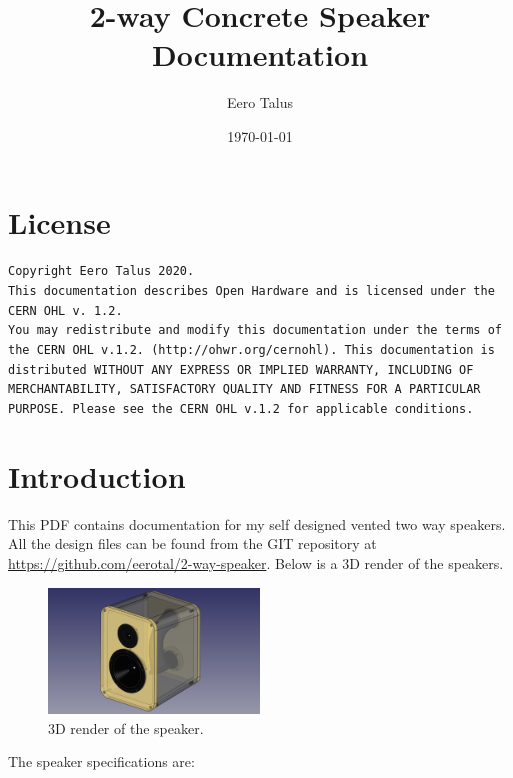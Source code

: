 \documentclass[10pt]{article}
\title{2-way Concrete Speaker Documentation}
\author{Eero Talus}
\date{\today}
\begin{document}
\maketitle
\tableofcontents

\section{License}

\begin{sloppypar}
\noindent
\texttt{Copyright Eero Talus 2020.}\\

\noindent
\texttt{This documentation describes Open Hardware and is licensed under the
CERN OHL v. 1.2.}\\

\noindent
\texttt{You may redistribute and modify this documentation under the terms of
the CERN OHL v.1.2. (http://ohwr.org/cernohl). This documentation is distributed
WITHOUT ANY EXPRESS OR IMPLIED WARRANTY, INCLUDING OF MERCHANTABILITY,
SATISFACTORY QUALITY AND FITNESS FOR A PARTICULAR PURPOSE. Please see the
CERN OHL v.1.2 for applicable conditions.}
\end{sloppypar}

\section{Introduction}

\noindent This PDF contains documentation for my self designed vented two way
speakers. All the design files can be found from the GIT repository at
\url{https://github.com/eerotal/2-way-speaker}. Below is a 3D render of the
speakers.\\

\begin{figure}[htp]
	\centering
	\includegraphics[width=0.5\textwidth]{../drawings/render.png}
	\caption{3D render of the speaker.}
\end{figure}

\pagebreak

\noindent The speaker specifications are:
\end{document}
